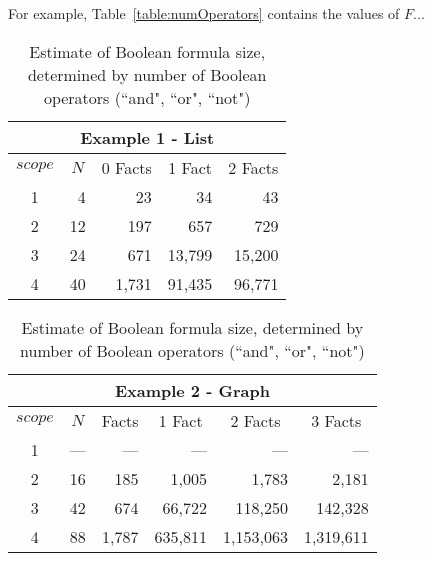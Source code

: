     For example, Table~\vref{table:numOperators} contains the values of $F$...

    \begin{singlespacing}
    \begin{table}[H]
    \caption[Estimate of Boolean formula size]{Estimate of Boolean formula size,
    determined by number of Boolean operators (``and", ``or", ``not")}
    \label{table:numOperators}
        \begin{center}

        \bigskip

        \begin{tabular}{|c|r|r|r|r|}
        \hline
            \multicolumn{ 5}{|c|}{\textbf{Example 1 - List}} \\
        \hline
            $scope$ & \multicolumn{1}{c|}{$N$} & \multicolumn{1}{c|}{0 Facts} & \multicolumn{1}{c|}{1 Fact} & \multicolumn{1}{c|}{2 Facts} \\
        \hline
                1 &  4 &    23  &     34  &     43  \\
                2 & 12 &   197  &    657  &    729  \\
                3 & 24 &   671  & 13,799  & 15,200  \\
                4 & 40 & 1,731  & 91,435  & 96,771  \\
        \hline
        \end{tabular}

        \bigskip

        \begin{tabular}{|c|r|r|r|r|r|}
        \hline
            \multicolumn{ 6}{|c|}{\textbf{Example 2 - Graph}} \\
        \hline
            $scope$ & \multicolumn{1}{c|}{$N$} & \multicolumn{1}{c|}{Facts} & \multicolumn{1}{c|}{1 Fact} & \multicolumn{1}{c|}{2 Facts} & \multicolumn{1}{c|}{3 Facts} \\
        \hline
                1 & ---&   ---  &     ---  &       ---  &       ---  \\
                2 & 16 &   185  &   1,005  &     1,783  &     2,181  \\
                3 & 42 &   674  &  66,722  &   118,250  &   142,328  \\
                4 & 88 & 1,787  & 635,811  & 1,153,063  & 1,319,611  \\
        \hline
        \end{tabular}


\end{center}
\end{table}
\end{singlespacing}
